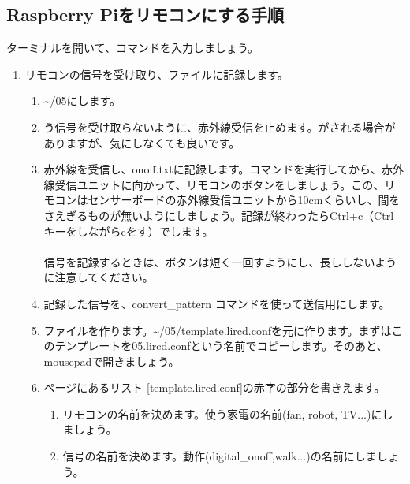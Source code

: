 \documentclass[text05.tex]{subfiles}
\begin{document}
\subsection{Raspberry Piをリモコンにする手順}
\noindent
ターミナルを開いて、コマンドを入力しましょう。
\begin{enumerate}
\item リモコンの信号を受け取り、ファイルに記録します。
 \begin{enumerate}[1]
  \item \textasciitilde /05にします。\\ 
  \item {}う信号を受け取らないように、赤外線受信を止めます。がされる場合がありますが、気にしなくても良いです。 \\ 
  \item 赤外線を受信し、onoff.txtに記録します。コマンドを実行してから、赤外線受信ユニットに向かって、リモコンのボタンをしましょう。この、リモコンはセンサーボードの赤外線受信ユニットから10cmくらいし、間をさえぎるものが無いようにしましょう。記録が終わったらCtrl+c（Ctrlキーをしながらcをす）でします。\\ \\信号を記録するときは、ボタンは短く一回すようにし、長ししないように注意してください。
  \item 記録した信号を、convert\_pattern コマンドを使って送信用にします。\\ 
  \item {}ファイルを作ります。\textasciitilde /05/template.lircd.confを元に作ります。まずはこのテンプレートを05.lircd.confという名前でコピーします。そのあと、mousepadで開きましょう。\\ 
  \item \pageref{template.lircd.conf}ページにあるリスト \ref{template.lircd.conf}の赤字の部分を書きえます。
  \begin{enumerate}[(1)]
    \item リモコンの名前を決めます。使う家電の名前(fan, robot, TV...)にしましょう。
    \item 信号の名前を決めます。動作(digital\_onoff,walk...)の名前にしましょう。

\end{enumerate}
\end{enumerate}
\end{enumerate}
\end{document}
